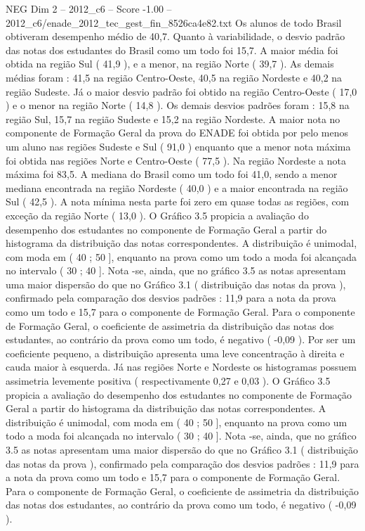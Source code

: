 \begin{textsample}{NEG Dim 2 – 2012\_c6 – Score -1.00 – 2012\_c6/enade\_2012\_tec\_gest\_fin\_8526ca4e82.txt}
Os alunos de todo Brasil obtiveram desempenho médio de 40,7.
Quanto à variabilidade, o desvio padrão das notas dos estudantes do Brasil como um todo foi 15,7.
A maior média foi obtida na região Sul ( 41,9 ), e a menor, na região Norte ( 39,7 ).
As demais médias foram : 41,5 na região Centro-Oeste, 40,5 na região Nordeste e 40,2 na região Sudeste.
Já o maior desvio padrão foi obtido na região Centro-Oeste ( 17,0 ) e o menor na região Norte ( 14,8 ).
Os demais desvios padrões foram : 15,8 na região Sul, 15,7 na região Sudeste e 15,2 na região Nordeste.
A maior nota no componente de Formação Geral da prova do ENADE foi obtida por pelo menos um aluno nas regiões Sudeste e Sul ( 91,0 ) enquanto que a menor nota máxima foi obtida nas regiões Norte e Centro-Oeste ( 77,5 ).
Na região Nordeste a nota máxima foi 83,5.
A mediana do Brasil como um todo foi 41,0, sendo a menor mediana encontrada na região Nordeste ( 40,0 ) e a maior encontrada na região Sul ( 42,5 ).
A nota mínima nesta parte foi zero em quase todas as regiões, com exceção da região Norte ( 13,0 ).
O Gráfico 3.5 propicia a avaliação do desempenho dos estudantes no componente de Formação Geral a partir do histograma da distribuição das notas correspondentes.
A distribuição é unimodal, com moda em ( 40 ; 50 ], enquanto na prova como um todo a moda foi alcançada no intervalo ( 30 ; 40 ].
Nota -se, ainda, que no gráfico 3.5 as notas apresentam uma maior dispersão do que no Gráfico 3.1 ( distribuição das notas da prova ), confirmado pela comparação dos desvios padrões : 11,9 para a nota da prova como um todo e 15,7 para o componente de Formação Geral.
Para o componente de Formação Geral, o coeficiente de assimetria da distribuição das notas dos estudantes, ao contrário da prova como um todo, é negativo ( -0,09 ).
Por ser um coeficiente pequeno, a distribuição apresenta uma leve concentração à direita e cauda maior à esquerda.
Já nas regiões Norte e Nordeste os histogramas possuem assimetria levemente positiva ( respectivamente 0,27 e 0,03 ).
O Gráfico 3.5 propicia a avaliação do desempenho dos estudantes no componente de Formação Geral a partir do histograma da distribuição das notas correspondentes.
A distribuição é unimodal, com moda em ( 40 ; 50 ], enquanto na prova como um todo a moda foi alcançada no intervalo ( 30 ; 40 ].
Nota -se, ainda, que no gráfico 3.5 as notas apresentam uma maior dispersão do que no Gráfico 3.1 ( distribuição das notas da prova ), confirmado pela comparação dos desvios padrões : 11,9 para a nota da prova como um todo e 15,7 para o componente de Formação Geral.
Para o componente de Formação Geral, o coeficiente de assimetria da distribuição das notas dos estudantes, ao contrário da prova como um todo, é negativo ( -0,09 ).

\end{textsample}
